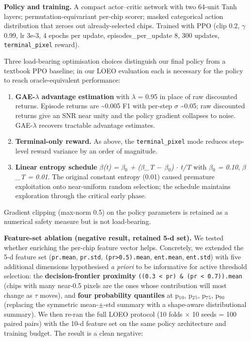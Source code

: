 \documentclass[sn-nature,lineno]{sn-jnl}
\providecommand{\tightlist}{\setlength{\itemsep}{0pt}\setlength{\parskip}{0pt}}
\theoremstyle{thmstyleone}
\theoremstyle{thmstyletwo}
\theoremstyle{thmstylethree}
\begin{document}
\textbf{Policy and training.} A compact actor--critic network with two 64-unit
Tanh layers; permutation-equivariant per-chip scorer; masked categorical
action distribution that zeroes out already-selected chips. Trained with
PPO \cite{schulman2017ppo} (clip 0.2, $\gamma$ 0.99, lr 3e-3, 4 epochs per update,
episodes\_per\_update 8, 300 updates, \texttt{terminal\_pixel} reward).

Three load-bearing optimisation choices distinguish our final policy from
a textbook PPO baseline; in our LOEO evaluation each is necessary for the
policy to reach oracle-equivalent performance:

\begin{enumerate}
\def\labelenumi{\arabic{enumi}.}
\tightlist
\item
  \textbf{GAE-$\lambda$ advantage estimation} with $\lambda$ = 0.95 in place of raw discounted
  returns. Episode returns are \textasciitilde0.005 F1 with per-step $\sigma$ \textasciitilde0.05; raw
  discounted returns give an SNR near unity and the policy gradient
  collapses to noise. GAE-$\lambda$ recovers tractable advantage estimates.
\item
  \textbf{Terminal-only reward.} As above, the \texttt{terminal\_pixel} mode reduces
  step-level reward variance by an order of magnitude.
\item
  \textbf{Linear entropy schedule} \emph{$\beta$(t) = $\beta$$_{0}$ + ($\beta$\_T $-$ $\beta$$_{0}$) $\cdot$ t/T} with
  \emph{$\beta$$_{0}$ = 0.10}, \emph{$\beta$\_T = 0.01}. The original constant entropy (0.01) caused
  premature exploitation onto near-uniform random selection; the schedule
  maintains exploration through the critical early phase.
\end{enumerate}

Gradient clipping (max-norm 0.5) on the policy parameters is retained as a
numerical safety measure but is not load-bearing.

\textbf{Feature-set ablation (negative result, retained 5-d set).} We tested
whether enriching the per-chip feature vector helps. Concretely, we
extended the 5-d feature set (\texttt{pr.mean}, \texttt{pr.std}, \texttt{(pr\textgreater{}0.5).mean},
\texttt{ent.mean}, \texttt{ent.std}) with five additional dimensions hypothesised \emph{a
priori} to be informative for active threshold selection: the
\textbf{decision-frontier proximity} \texttt{((0.3\ \textless{}\ pr)\ \&\ (pr\ \textless{}\ 0.7)).mean} (chips
with many near-0.5 pixels are the ones whose contribution will most
change as $\tau$ moves), and \textbf{four probability quantiles} at p$_{1}$$_{0}$, p$_{2}$$_{5}$, p$_{7}$$_{5}$,
p$_{9}$$_{0}$ (replacing the symmetric mean-$\pm$-std summary with a shape-aware
distributional summary). We then re-ran the full LOEO protocol (10
folds $\times$ 10 seeds = 100 paired pairs) with the 10-d feature set on the
same policy architecture and training budget. The result is a clean
negative:
\end{document}
